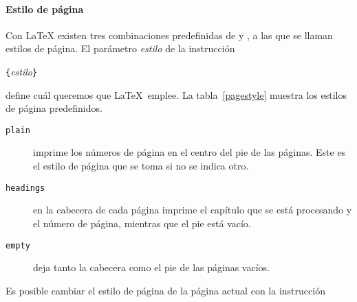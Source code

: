 \clearpage
%
%

\paragraph{Estilo de página}

Con \LaTeX{} existen tres combinaciones predefinidas de 
y   ,   a   las  que   se   llaman  estilos   de
página.  El parámetro
\emph{estilo} de la instrucción

%
%
%
%
%
%

\begin{command}
\verb|{|\emph{estilo}\verb|}|
\end{command}

\noindent   define    cuál   queremos    que   \LaTeX\    emplee.   La
tabla~\ref{pagestyle} muestra los estilos de página predefinidos.

\begin{table}[!hbp]
\caption{Estilos de página predefinidos en \LaTeX} \label{pagestyle}
\begin{lined}{12cm}
\begin{description}

\item[\normalfont\texttt{plain}] imprime  los números de página  en el
centro del pie de las páginas. Este es el estilo de página que se toma
si no se indica otro.

\item[\normalfont\texttt{headings}]  en  la  cabecera de  cada  página
imprime el  capítulo que  se está  procesando y  el número  de página,
mientras que el pie está vacío.

\item[\normalfont\texttt{empty}] deja tanto la cabecera como el pie de
las páginas vacíos.

\end{description}
\end{lined}
\end{table}

Es posible  cambiar el  estilo de  página de la  página actual  con la
instrucción


